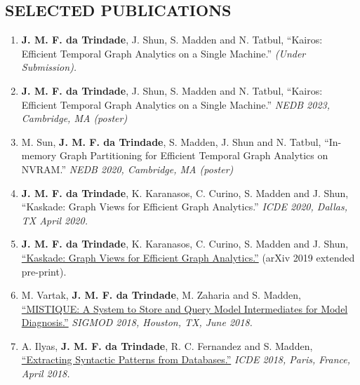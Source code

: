 \documentclass[centered,overlapped]{res}
\begin{document}
\begin{resume}
\section{SELECTED PUBLICATIONS}
\begin{enumerate}
  \item \textbf{J. M. F. da Trindade}, J. Shun, S. Madden and N. Tatbul, ``Kairos: Efficient Temporal Graph Analytics on a Single Machine.'' \textit{(Under Submission).}
  \item \textbf{J. M. F. da Trindade}, J. Shun, S. Madden and N. Tatbul, ``Kairos: Efficient Temporal Graph Analytics on a Single Machine.'' \textit{NEDB 2023, Cambridge, MA (poster)}
  \item M. Sun, \textbf{J. M. F. da Trindade}, S. Madden, J. Shun and N. Tatbul, ``In-memory Graph Partitioning for Efficient Temporal Graph Analytics on NVRAM.''  \textit{NEDB 2020, Cambridge, MA (poster)}
  \item \textbf{J. M. F. da Trindade}, K. Karanasos, C. Curino, S. Madden and J. Shun, ``Kaskade: Graph Views for Efficient Graph Analytics.'' \textit{ICDE 2020, Dallas, TX April 2020.}
  \item \textbf{J. M. F. da Trindade}, K. Karanasos, C. Curino, S. Madden and J. Shun, \href{https://arxiv.org/abs/1906.05162}{``Kaskade: Graph Views for Efficient Graph Analytics.''} (arXiv 2019 extended pre-print).
  \item M. Vartak, \textbf{J. M. F. da Trindade}, M. Zaharia and S. Madden, \href{https://cs.stanford.edu/~matei/papers/2018/sigmod_mistique.pdf}{``MISTIQUE: A System to Store and Query Model Intermediates for Model Diagnosis.''} \textit{SIGMOD 2018, Houston, TX, June 2018.}
  \item A. Ilyas, \textbf{J. M. F. da Trindade}, R. C. Fernandez and S. Madden, \href{https://arxiv.org/pdf/1710.11528.pdf}{``Extracting Syntactic Patterns from Databases.''} \textit{ICDE 2018, Paris, France, April 2018.}

\end{enumerate}
\end{resume}
\end{document}

